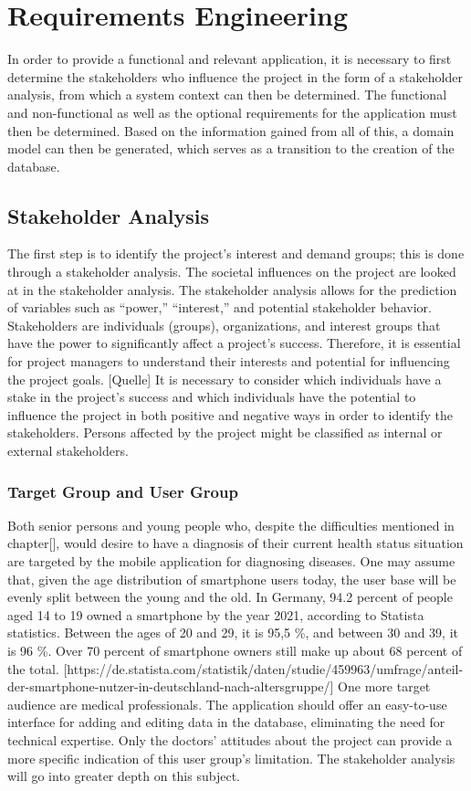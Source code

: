 
\chapter{Requirements Engineering}
In order to provide a functional and relevant application, it is necessary to first determine the stakeholders who influence the project in the form of a stakeholder analysis, from which a system context can then be determined. The functional and non-functional as well as the optional requirements for the application must then be determined. Based on the information gained from all of this, a domain model can then be generated, which serves as a transition to the creation of the database.

\section{Stakeholder Analysis}
The first step is to identify the project's interest and demand groups; this is done through a stakeholder analysis. The societal influences on the project are looked at in the stakeholder analysis. The stakeholder analysis allows for the prediction of variables such as “power,” “interest,” and potential stakeholder behavior. Stakeholders are individuals (groups), organizations, and interest groups that have the power to significantly affect a project's success. Therefore, it is essential for project managers to understand their interests and potential for influencing the project goals. [Quelle] It is necessary to consider which individuals have a stake in the project's success and which individuals have the potential to influence the project in both positive and negative ways in order to identify the stakeholders. Persons affected by the project might be classified as internal or external stakeholders. 

\subsection{Target Group and User Group}
Both senior persons and young people who, despite the difficulties mentioned in chapter[], would desire to have a diagnosis of their current health status situation are targeted by the mobile application for diagnosing diseases.
One may assume that, given the age distribution of smartphone users today, the user base will be evenly split between the young and the old. In Germany, 94.2 percent of people aged 14 to 19 owned a smartphone by the year 2021, according to Statista statistics. Between the ages of 20 and 29, it is 95,5 \%, and between 30 and 39, it is 96 \%. Over 70 percent of smartphone owners still make up about 68 percent of the total.  [https://de.statista.com/statistik/daten/studie/459963/umfrage/anteil-der-smartphone-nutzer-in-deutschland-nach-altersgruppe/]
One more target audience are medical professionals. The application should offer an easy-to-use interface for adding and editing data in the database, eliminating the need for technical expertise. Only the doctors' attitudes about the project can provide a more specific indication of this user group's limitation. The stakeholder analysis will go into greater depth on this subject. 

